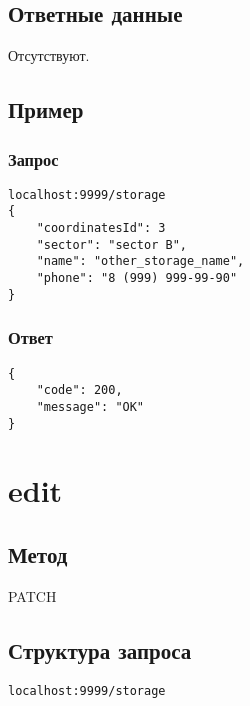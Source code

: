 \section*{Ответные данные}
Отсутствуют.

\section*{Пример}

\subsection*{Запрос}

\begin{lstlisting}
localhost:9999/storage
{
    "coordinatesId": 3
    "sector": "sector B",
    "name": "other_storage_name",
    "phone": "8 (999) 999-99-90"
}
\end{lstlisting}
\hfill

\subsection*{Ответ}

\begin{lstlisting}
{
	"code": 200,
	"message": "OK"
}
\end{lstlisting}
\hfill


\chapter{edit}

\section*{Метод}
PATCH

\section*{Структура запроса}
\begin{lstlisting}
localhost:9999/storage
\end{lstlisting}
\hfill

